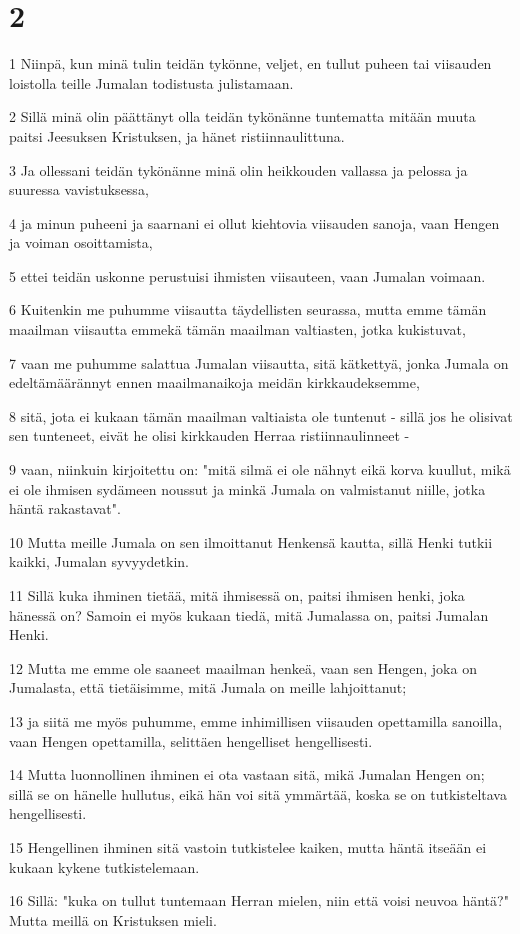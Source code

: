 \chapter{2}

\par 1 Niinpä, kun minä tulin teidän tykönne, veljet, en tullut puheen tai viisauden loistolla teille Jumalan todistusta julistamaan.
\par 2 Sillä minä olin päättänyt olla teidän tykönänne tuntematta mitään muuta paitsi Jeesuksen Kristuksen, ja hänet ristiinnaulittuna.
\par 3 Ja ollessani teidän tykönänne minä olin heikkouden vallassa ja pelossa ja suuressa vavistuksessa,
\par 4 ja minun puheeni ja saarnani ei ollut kiehtovia viisauden sanoja, vaan Hengen ja voiman osoittamista,
\par 5 ettei teidän uskonne perustuisi ihmisten viisauteen, vaan Jumalan voimaan.
\par 6 Kuitenkin me puhumme viisautta täydellisten seurassa, mutta emme tämän maailman viisautta emmekä tämän maailman valtiasten, jotka kukistuvat,
\par 7 vaan me puhumme salattua Jumalan viisautta, sitä kätkettyä, jonka Jumala on edeltämäärännyt ennen maailmanaikoja meidän kirkkaudeksemme,
\par 8 sitä, jota ei kukaan tämän maailman valtiaista ole tuntenut - sillä jos he olisivat sen tunteneet, eivät he olisi kirkkauden Herraa ristiinnaulinneet -
\par 9 vaan, niinkuin kirjoitettu on: "mitä silmä ei ole nähnyt eikä korva kuullut, mikä ei ole ihmisen sydämeen noussut ja minkä Jumala on valmistanut niille, jotka häntä rakastavat".
\par 10 Mutta meille Jumala on sen ilmoittanut Henkensä kautta, sillä Henki tutkii kaikki, Jumalan syvyydetkin.
\par 11 Sillä kuka ihminen tietää, mitä ihmisessä on, paitsi ihmisen henki, joka hänessä on? Samoin ei myös kukaan tiedä, mitä Jumalassa on, paitsi Jumalan Henki.
\par 12 Mutta me emme ole saaneet maailman henkeä, vaan sen Hengen, joka on Jumalasta, että tietäisimme, mitä Jumala on meille lahjoittanut;
\par 13 ja siitä me myös puhumme, emme inhimillisen viisauden opettamilla sanoilla, vaan Hengen opettamilla, selittäen hengelliset hengellisesti.
\par 14 Mutta luonnollinen ihminen ei ota vastaan sitä, mikä Jumalan Hengen on; sillä se on hänelle hullutus, eikä hän voi sitä ymmärtää, koska se on tutkisteltava hengellisesti.
\par 15 Hengellinen ihminen sitä vastoin tutkistelee kaiken, mutta häntä itseään ei kukaan kykene tutkistelemaan.
\par 16 Sillä: "kuka on tullut tuntemaan Herran mielen, niin että voisi neuvoa häntä?" Mutta meillä on Kristuksen mieli.

